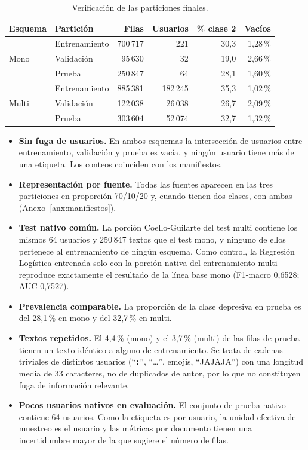 \documentclass[12pt,a4paper]{article}
\begin{document}
\begin{table}[H]
\centering
\small
\caption{Verificación de las particiones finales.}
\label{tab:splits}
\begin{tabular}{llrrrr}
\toprule
\textbf{Esquema} & \textbf{Partición} & \textbf{Filas} & \textbf{Usuarios} & \textbf{\% clase 2} & \textbf{Vacíos} \\
\midrule
\multirow{3}{*}{Mono}  & Entrenamiento & 700\,717 & 221 & 30{,}3 & 1{,}28\,\% \\
                       & Validación    &  95\,630 &  32 & 19{,}0 & 2{,}66\,\% \\
                       & Prueba        & 250\,847 &  64 & 28{,}1 & 1{,}60\,\% \\
\midrule
\multirow{3}{*}{Multi} & Entrenamiento & 885\,381 & 182\,245 & 35{,}3 & 1{,}02\,\% \\
                       & Validación    & 122\,038 &  26\,038 & 26{,}7 & 2{,}09\,\% \\
                       & Prueba        & 303\,604 &  52\,074 & 32{,}7 & 1{,}32\,\% \\
\bottomrule
\end{tabular}
\end{table}

\begin{itemize}[leftmargin=2em]
    \item \textbf{Sin fuga de usuarios.} En ambos esquemas la intersección de usuarios entre entrenamiento, validación y prueba es vacía, y ningún usuario tiene más de una etiqueta. Los conteos coinciden con los manifiestos.
    \item \textbf{Representación por fuente.} Todas las fuentes aparecen en las tres particiones en proporción 70/10/20 y, cuando tienen dos clases, con ambas (Anexo~\ref{anx:manifiestos}).
    \item \textbf{Test nativo común.} La porción Coello-Guilarte del test multi contiene los mismos 64 usuarios y 250\,847 textos que el test mono, y ninguno de ellos pertenece al entrenamiento de ningún esquema. Como control, la Regresión Logística entrenada solo con la porción nativa del entrenamiento multi reproduce exactamente el resultado de la línea base mono (F1-macro 0{,}6528; AUC 0{,}7527).
    \item \textbf{Prevalencia comparable.} La proporción de la clase depresiva en prueba es del 28{,}1\,\% en mono y del 32{,}7\,\% en multi.
    \item \textbf{Textos repetidos.} El 4{,}4\,\% (mono) y el 3{,}7\,\% (multi) de las filas de prueba tienen un texto idéntico a alguno de entrenamiento. Se trata de cadenas triviales de distintos usuarios (``\texttt{:}'', ``\dots'', emojis, ``JAJAJA'') con una longitud media de 33 caracteres, no de duplicados de autor, por lo que no constituyen fuga de información relevante.
    \item \textbf{Pocos usuarios nativos en evaluación.} El conjunto de prueba nativo contiene 64 usuarios. Como la etiqueta es por usuario, la unidad efectiva de muestreo es el usuario y las métricas por documento tienen una incertidumbre mayor de la que sugiere el número de filas.
\end{itemize}
\end{document}
